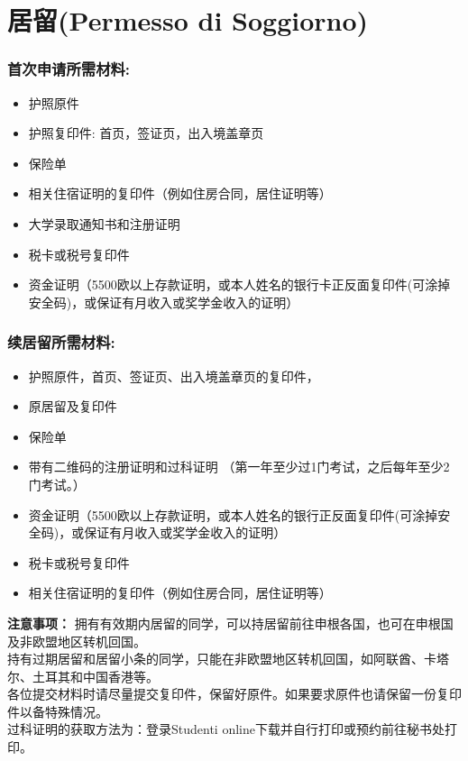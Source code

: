 \section{居留(Permesso di Soggiorno)}
\subsubsection{首次申请所需材料:}
\begin{itemize} 
\item 护照原件
\item 护照复印件: 首页，签证页，出入境盖章页
\item 保险单 
\item 相关住宿证明的复印件（例如住房合同，居住证明等）
\item 大学录取通知书和注册证明
\item 税卡或税号复印件
\item 资金证明（5500欧以上存款证明，或本人姓名的银行卡正反面复印件(可涂掉安全码)，或保证有月收入或奖学金收入的证明）
\end{itemize}

\subsubsection{续居留所需材料:}
\begin{itemize} 
\item 护照原件，首页、签证页、出入境盖章页的复印件，
\item 原居留及复印件
\item 保险单
\item 带有二维码的注册证明和过科证明  （第一年至少过1门考试，之后每年至少2门考试。）
\item 资金证明（5500欧以上存款证明，或本人姓名的银行正反面复印件(可涂掉安全码)，或保证有月收入或奖学金收入的证明）
\item 税卡或税号复印件
\item 相关住宿证明的复印件（例如住房合同，居住证明等）
\end{itemize}
\textbf{注意事项：}
拥有有效期内居留的同学，可以持居留前往申根各国，也可在申根国及非欧盟地区转机回国。\\
持有过期居留和居留小条的同学，只能在非欧盟地区转机回国，如阿联酋、卡塔尔、土耳其和中国香港等。\\
各位提交材料时请尽量提交复印件，保留好原件。如果要求原件也请保留一份复印件以备特殊情况。\\
过科证明的获取方法为：登录Studenti online下载并自行打印或预约前往秘书处打印。\\

